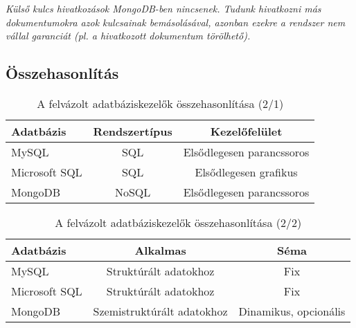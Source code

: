 \textit{Külső kulcs hivatkozások MongoDB-ben nincsenek. Tudunk hivatkozni más dokumentumokra azok kulcsainak bemásolásával, azonban ezekre a rendszer nem vállal garanciát (pl. a hivatkozott dokumentum törölhető).}


\subsection{Összehasonlítás}

\begin{table}[h]
\centering
\caption{A felvázolt adatbáziskezelők összehasonlítása (2/1)}
\label{tab:db1}
\begin{tabular}{|l|c|c|}
\hline
Adatbázis & Rendszertípus &  Kezelőfelület\\
\hline
MySQL & SQL & Elsődlegesen parancssoros\\
\hline
Microsoft SQL & SQL & Elsődlegesen grafikus\\
\hline
MongoDB & NoSQL & Elsődlegesen parancssoros\\
\hline
\end{tabular}
\end{table}

\begin{table}[h]
\centering
\caption{A felvázolt adatbáziskezelők összehasonlítása (2/2)}
\label{tab:db2}
\begin{tabular}{|l|c|c|}
\hline
Adatbázis & Alkalmas &  Séma\\
\hline
MySQL & Struktúrált adatokhoz & Fix\\
\hline
Microsoft SQL & Struktúrált adatokhoz & Fix\\
\hline
MongoDB & Szemistruktúrált adatokhoz & Dinamikus, opcionális\\
\hline
\end{tabular}
\end{table}
